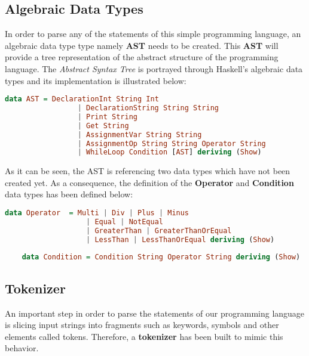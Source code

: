 \documentclass[a4paper, onecolumn]{article}
\begin{document}
    \subsection{Algebraic Data Types}
    
    In order to parse any of the statements of this simple programming language, an algebraic data type type namely \textbf{AST} needs to be created. This \textbf{AST} will provide a tree representation of the abstract structure of the programming language. The \textit{Abstract Syntax Tree} is portrayed through Haskell's algebraic data types and its implementation is illustrated below:
    
    \begin{tcolorbox}
    \begin{lstlisting}[language=Haskell] 
        data AST = DeclarationInt String Int 
                 | DeclarationString String String
                 | Print String
                 | Get String
                 | AssignmentVar String String
                 | AssignmentOp String String Operator String 
                 | WhileLoop Condition [AST] deriving (Show)
    \end{lstlisting}
    \end{tcolorbox}
    
    \noindent As it can be seen, the AST is referencing two data types which have not been created yet. As a consequence, the definition of the \textbf{Operator} and \textbf{Condition} data types has been defined below: 
    
    \begin{tcolorbox}
    \begin{lstlisting}[language=Haskell] 
    data Operator  = Multi | Div | Plus | Minus
                   | Equal | NotEqual
                   | GreaterThan | GreaterThanOrEqual 
                   | LessThan | LessThanOrEqual deriving (Show)
        
    data Condition = Condition String Operator String deriving (Show) 
    \end{lstlisting}
    \end{tcolorbox}
    
    \subsection{Tokenizer}
    
    An important step in order to parse the statements of our programming language is slicing input strings into fragments such as keywords, symbols and other elements called tokens. Therefore, a \textbf{tokenizer} has been built to mimic this behavior.
    
\end{document}
